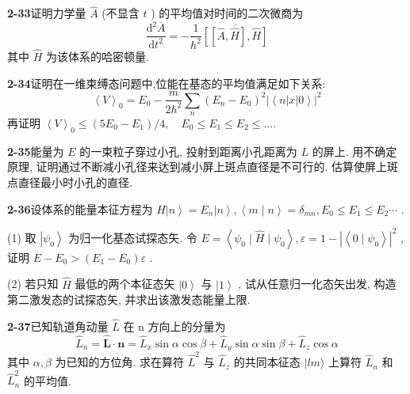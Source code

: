 \vfill

\newpage
\vfill

\noindent
\textbf{2-33}\quad 证明力学量 $\hat{A}$ (不显含 $t$ ) 的平均值对时间的二次微商为
$$
\frac {\mathrm{d} ^ {2} \overline {{A}}}{\mathrm{d} t ^ {2}} = - \frac {1}{\hbar^ {2}} \overline {{\left[ \left[ \hat {A} , \hat {H} \right] , \hat {H} \right]}}
$$
其中 $\hat{H}$ 为该体系的哈密顿量.

\vfill

\newpage
\vfill

\noindent
\textbf{2-34}\quad 证明在一维束缚态问题中,位能在基态的平均值满足如下关系:
$$
\left\langle V \right\rangle_ {0} = E _ {0} - \frac {m}{2 \hbar^ {2}} \sum_ {n} (E _ {n} - E _ {0}) ^ {2} \left| \left\langle n \right| x \left| 0 \right\rangle \right| ^ {2}
$$
再证明 $\left\langle V\right\rangle_0\leqslant (5E_0 - E_1) / 4,\quad E_0\leqslant E_1\leqslant E_2\leqslant \dots .$

\vfill

\newpage
\vfill

\noindent
\textbf{2-35}\quad 能量为 $E$ 的一束粒子穿过小孔, 投射到距离小孔距离为 $L$ 的屏上. 用不确定原理, 证明通过不断减小孔径来达到减小屏上斑点直径是不可行的. 估算使屏上斑点直径最小时小孔的直径.

\vfill

\newpage
\vfill

\noindent
\textbf{2-36}\quad 设体系的能量本征方程为 $\hat{H}\left|n\right\rangle = E_n\left|n\right\rangle, \left\langle m\mid n\right\rangle = \delta_{mn}, E_0 \leqslant E_1 \leqslant E_2 \cdots$ . 

(1) 取 $\left|\psi_0\right\rangle$ 为归一化基态试探态矢. 令 $E = \left\langle \psi_0\mid \hat{H}\mid \psi_0\right\rangle, \varepsilon = 1 - \left|\left\langle 0\mid \psi_0\right\rangle\right|^2$ , 证明 $E - E_0 > (E_1 - E_0)\varepsilon$ . 

(2) 若只知 $\hat{H}$ 最低的两个本征态矢 $\left|0\right\rangle$ 与 $\left|1\right\rangle$ , 试从任意归一化态矢出发, 构造第二激发态的试探态矢, 并求出该激发态能量上限.

\vfill

\newpage
\vfill

\noindent
\textbf{2-37}\quad 已知轨道角动量 $\hat{L}$ 在 n 方向上的分量为
$$
\hat {L} _ {n} = \hat {\boldsymbol {L}} \cdot \boldsymbol {n} = \hat {L} _ {x} \sin \alpha \cos \beta + \hat {L} _ {y} \sin \alpha \sin \beta + \hat {L} _ {z} \cos \alpha
$$
其中 $\alpha, \beta$ 为已知的方位角. 求在算符 $\hat{L}^2$ 与 $\hat{L}_z$ 的共同本征态 $|lm\rangle$ 上算符 $\hat{L}_n$ 和 $\hat{L}_n^2$ 的平均值.

